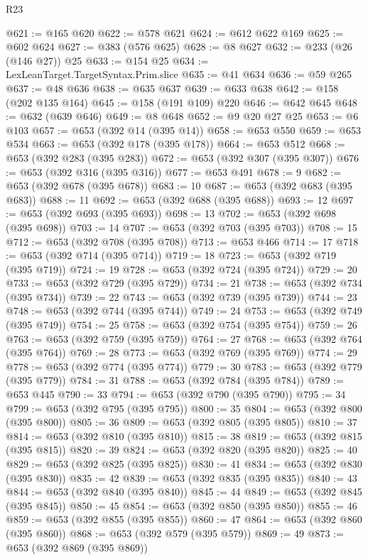 \begin{lexlean}{R23}
\begin{coremodule}
@621 := @165 @620
@622 := @578 @621
@624 := @612 @622 @169
@625 := @602 @624
@627 := @383 (@576 @625)
@628 := @8 @627
@632 := @233 (@26 (@146 @27)) @25
@633 := @154 @25
@634 := LexLeanTarget.TargetSyntax.Prim.slice
@635 := @41 @634
@636 := @59 @265
@637 := @48 @636
@638 := @635 @637
@639 := @633 @638
@642 := @158 (@202 @135 @164)
@645 := @158 (@191 @109) @220
@646 := @642 @645
@648 := @632 (@639 @646)
@649 := @8 @648
@652 := @9 @20 @27 @25
@653 := @6 @103
@657 := @653 (@392 @14 (@395 @14))
@658 := @653 @550
@659 := @653 @534
@663 := @653 (@392 @178 (@395 @178))
@664 := @653 @512
@668 := @653 (@392 @283 (@395 @283))
@672 := @653 (@392 @307 (@395 @307))
@676 := @653 (@392 @316 (@395 @316))
@677 := @653 @491
@678 := 9
@682 := @653 (@392 @678 (@395 @678))
@683 := 10
@687 := @653 (@392 @683 (@395 @683))
@688 := 11
@692 := @653 (@392 @688 (@395 @688))
@693 := 12
@697 := @653 (@392 @693 (@395 @693))
@698 := 13
@702 := @653 (@392 @698 (@395 @698))
@703 := 14
@707 := @653 (@392 @703 (@395 @703))
@708 := 15
@712 := @653 (@392 @708 (@395 @708))
@713 := @653 @466
@714 := 17
@718 := @653 (@392 @714 (@395 @714))
@719 := 18
@723 := @653 (@392 @719 (@395 @719))
@724 := 19
@728 := @653 (@392 @724 (@395 @724))
@729 := 20
@733 := @653 (@392 @729 (@395 @729))
@734 := 21
@738 := @653 (@392 @734 (@395 @734))
@739 := 22
@743 := @653 (@392 @739 (@395 @739))
@744 := 23
@748 := @653 (@392 @744 (@395 @744))
@749 := 24
@753 := @653 (@392 @749 (@395 @749))
@754 := 25
@758 := @653 (@392 @754 (@395 @754))
@759 := 26
@763 := @653 (@392 @759 (@395 @759))
@764 := 27
@768 := @653 (@392 @764 (@395 @764))
@769 := 28
@773 := @653 (@392 @769 (@395 @769))
@774 := 29
@778 := @653 (@392 @774 (@395 @774))
@779 := 30
@783 := @653 (@392 @779 (@395 @779))
@784 := 31
@788 := @653 (@392 @784 (@395 @784))
@789 := @653 @445
@790 := 33
@794 := @653 (@392 @790 (@395 @790))
@795 := 34
@799 := @653 (@392 @795 (@395 @795))
@800 := 35
@804 := @653 (@392 @800 (@395 @800))
@805 := 36
@809 := @653 (@392 @805 (@395 @805))
@810 := 37
@814 := @653 (@392 @810 (@395 @810))
@815 := 38
@819 := @653 (@392 @815 (@395 @815))
@820 := 39
@824 := @653 (@392 @820 (@395 @820))
@825 := 40
@829 := @653 (@392 @825 (@395 @825))
@830 := 41
@834 := @653 (@392 @830 (@395 @830))
@835 := 42
@839 := @653 (@392 @835 (@395 @835))
@840 := 43
@844 := @653 (@392 @840 (@395 @840))
@845 := 44
@849 := @653 (@392 @845 (@395 @845))
@850 := 45
@854 := @653 (@392 @850 (@395 @850))
@855 := 46
@859 := @653 (@392 @855 (@395 @855))
@860 := 47
@864 := @653 (@392 @860 (@395 @860))
@868 := @653 (@392 @579 (@395 @579))
@869 := 49
@873 := @653 (@392 @869 (@395 @869))

\end{coremodule}
\end{lexlean}
